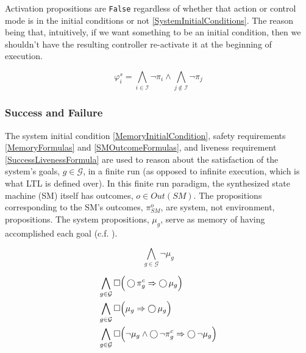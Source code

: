Activation propositions are \texttt{False} regardless of whether that action or control mode is in the initial conditions or not \eqref{SystemInitialConditions}.
The reason being that, intuitively, if we want something to be an initial condition, then we shouldn't have the resulting controller re-activate it at the beginning of execution.

\begin{equation}\label{SystemInitialConditions}
	\varphi_i^s = \bigwedge \limits_{i \in \mathcal{I}} \lnot \pi_i \wedge \bigwedge \limits_{j \not \in \mathcal{I}} \lnot \pi_j
\end{equation}



\subsubsection{Success and Failure}

The system initial condition \eqref{MemoryInitialCondition}, safety requirements \eqref{MemoryFormulas} and \eqref{SMOutcomeFormulas}, and liveness requirement \eqref{SuccessLivenessFormula} are used to reason about the satisfaction of the system's goals, $g \in \mathcal{G}$, in a finite run (as opposed to infinite execution, which is what LTL is defined over).
In this finite run paradigm, the synthesized state machine (SM) itself has outcomes, $o \in Out(SM)$.
The propositions corresponding to the SM's outcomes, $\pi_{SM}^o$, are system, not environment, propositions.
The system propositions, $\mu_g$, serve as memory of having accomplished each goal (c.f. \cite{Vasu2012IROS}).

\begin{equation}\label{MemoryInitialCondition}
	\bigwedge \limits_{g \in \mathcal{G}} \lnot \mu_g 
\end{equation}

\begin{subequations}
	\label{MemoryFormulas}
	\begin{align}
		\bigwedge \limits_{g \in \mathcal{G}} \operatorname{\Box}& \Big( \operatorname{\bigcirc} \pi_g^c \Rightarrow \operatorname{\bigcirc} \mu_g \Big) \label{MemoryFormula1}\\
		\bigwedge \limits_{g \in \mathcal{G}}\operatorname{\Box}& \Big(  \mu_g \Rightarrow \operatorname{\bigcirc} \mu_g \Big) \label{MemoryFormula2}\\
		\bigwedge \limits_{g \in \mathcal{G}}\operatorname{\Box}& \Big(  \lnot \mu_g \wedge \operatorname{\bigcirc} \lnot \pi_g^c \Rightarrow \operatorname{\bigcirc} \lnot \mu_g \Big) \label{MemoryFormula3}
\end{align}
\end{subequations}

